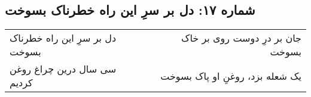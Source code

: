 \begin{center}
\section*{شماره ۱۷: دل بر سرِ این راه خطرناک بسوخت}
\label{sec:017}
\begin{longtable}{l p{0.5cm} r}
دل بر سرِ این راه خطرناک بسوخت
&&
جان بر درِ دوست روی بر خاک بسوخت
\\
سی سال درین چراغ روغن کردیم
&&
یک شعله بزد، روغنِ او پاک بسوخت
\\
\end{longtable}
\end{center}
